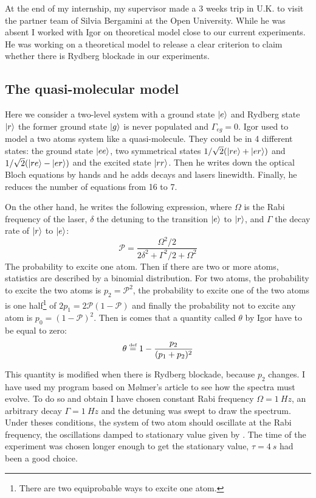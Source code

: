 \documentclass[twoside, open=right
]{scrreprt}
\newcommand{\defi}{\xspace\ensuremath{\overset{\text{\tiny def}}{=}}\xspace}
\newcommand{\ff}{\ensuremath{\ket{g}}\xspace}
\newcommand{\ee}{\ensuremath{\ket{e}}\xspace}
\newcommand{\rr}{\ensuremath{\ket{r}}\xspace}
\newcommand{\Om}{\Omega}
\newcommand{\Ga}{\Gamma}
\newcommand{\mc}[1]{\mathcal{#1}}
\newcommand{\pp}{\mathcal{P}}
\begin{document}
\par At the end of my internship, my supervisor made a 3 weeks trip in U.K. to visit the partner team of Silvia Bergamini at the Open University. While he was absent I worked with Igor on theoretical model close to our current experiments. He was working on a theoretical model to release a clear criterion to claim whether there is Rydberg blockade in our experiments.

\subsection{The quasi-molecular model \label{qm-model}}

\par Here we consider a two-level system with a ground state \ee and Rydberg state \rr the former ground state \ff is never populated and $\Ga_{eg}=0$. Igor used to model a two atoms system like a quasi-molecule. They could be in 4 different states: the ground state $\ket{ee}$, two symmetrical states $1/\sqrt{2} (\ket{re} +\ket{er})$ and $1/\sqrt{2} (\ket{re} -\ket{er})$ and the excited state $\ket{rr}$. Then he writes down the optical Bloch equations by hands and he adds decays and lasers linewidth. Finally, he reduces the number of equations from 16 to 7.

\par On the other hand, he writes the following expression, where $\Om$ is the Rabi frequency of the laser, $\delta$ the detuning to the transition \ee to \rr, and $\Ga$ the decay rate of \rr to \ee:
\begin{equation}
 \mc{P} = \frac{\Om^2/2}{2\delta^2 + \Ga^2/2 + \Om^2} \label{rabi-eq}
\end{equation}
The probability to excite one atom. Then if there are two or more atoms, statistics are described by a binomial distribution. For two atoms, the probability to excite the two atoms is $p_2 = \pp^2$, the probability to excite one of the two atoms is one half\footnote{There are two equiprobable ways to excite one atom.} of $2 p_1 = 2 \pp (1-\pp)$ and finally the probability not to excite any atom is $p_0 = (1-\pp)^2$. Then is comes that a quantity called $\theta$ by Igor have to be equal to zero: \[ \theta \defi 1 - \frac{p_2}{(p_1 + p_2)^2} \]

\par This quantity is modified when there is Rydberg blockade, because $p_2$ changes. I have used my program based on Mølmer's article to see how the spectra must evolve. To do so and obtain  I have chosen constant Rabi frequency $\Om = \SI{1}{Hz}$, an arbitrary decay $\Ga = \SI{1}{Hz}$ and the detuning was swept to draw the spectrum. Under theses conditions, the system of two atom should oscillate at the Rabi frequency, the oscillations damped to stationary value given by . The time of the experiment was chosen longer enough to get the stationary value, $\tau = \SI{4}{s}$ had been a good choice.
\end{document}
